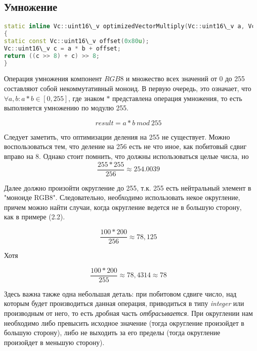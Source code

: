 
\subsection{Умножение}

\begin{lstlisting}[language=c++]
static inline Vc::uint16\_v optimizedVectorMultiply(Vc::uint16\_v a, Vc::uint16\_v b)
{
static const Vc::uint16\_v offset(0x80u);
Vc::uint16\_v c = a * b + offset;
return ((c >> 8) + c) >> 8;
}
\end{lstlisting}

Операция умножения компонент $RGB8$ и множество всех значений от 0 до 255 составляют собой некоммутативный моноид. В первую очередь, это означает, что $\forall a, b : a * b \in [0, 255]$, где знаком $*$ представлена операция умножения, то есть выполняется умножению по модулю 255. 

\begin{equation}
result = a * b~mod~255
\end{equation}


Следует заметить, что оптимизации деления на 255 не существует. Можно воспользоваться тем, что деление на 256 есть не что иное, как побитовый сдвиг вправо на 8. Однако стоит помнить, что должны использоваться целые числа, но
\begin{equation}
\frac{255*255}{256} \approx 254.0039
\end{equation}

Далее должно произойти округление до 255, т.к. 255 есть нейтральный элемент в "моноиде RGB8".
Следовательно, необходимо использовать некое округление, причем можно найти случаи, когда округление ведется не в большую сторону, как в примере (2.2).

\begin{equation}
\frac{100*200}{256} \approx 78,125
\end{equation}

Хотя 

\begin{equation}
\frac{100*200}{255} \approx 78,4314 \approx 78
\end{equation}

Здесь важна также одна небольшая деталь: при побитовом сдвиге число, над которым будет производиться данная операция, приводиться в типу \textit{integer} или производным от него, то есть дробная часть \textit{отбрасывается}. При округлении нам необходимо либо превысить исходное значение (тогда округление произойдет в большую сторону), либо не выходить за его пределы (тогда округление произойдет в меньшую сторону). 

